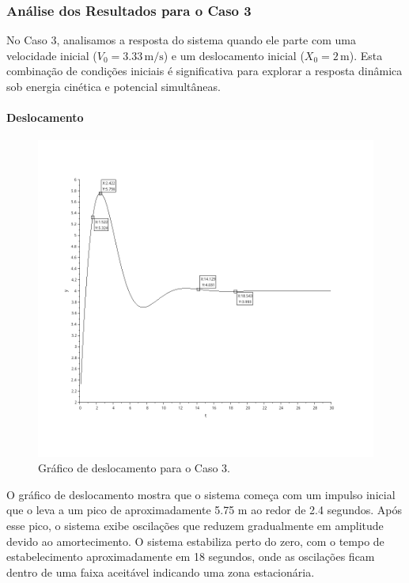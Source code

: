 \subsubsection{Análise dos Resultados para o Caso 3}
No Caso 3, analisamos a resposta do sistema quando ele parte com uma velocidade inicial (\(V_0 = 3.33 \, \text{m/s}\)) e um deslocamento inicial (\(X_0 = 2 \, \text{m}\)). Esta combinação de condições iniciais é significativa para explorar a resposta dinâmica sob energia cinética e potencial simultâneas.

\paragraph{Deslocamento}
\begin{figure}[H]
    \centering
    \includegraphics[height=0.7\textwidth]{atividades/2-atividade/assets/deslocamento-caso-3.png}
    \caption{Gráfico de deslocamento para o Caso 3.}
\end{figure}
O gráfico de deslocamento mostra que o sistema começa com um impulso inicial que o leva a um pico de aproximadamente 5.75 m ao redor de 2.4 segundos. Após esse pico, o sistema exibe oscilações que reduzem gradualmente em amplitude devido ao amortecimento. O sistema estabiliza perto do zero, com o tempo de estabelecimento aproximadamente em 18 segundos, onde as oscilações ficam dentro de uma faixa aceitável indicando uma zona estacionária.


